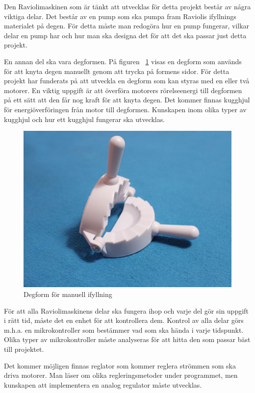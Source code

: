 Den Raviolimaskinen som är tänkt att utvecklas för detta projekt består av några viktiga delar. Det består av en pump som ska pumpa fram Raviolis ifyllnings materialet på degen. För detta måste man redogöra hur en pump fungerar, vilkar delar en pump har och hur man ska designa det för att det ska passar just detta projekt.\medskip

En annan del ska vara degformen. På figuren ~\ref{degfrom} visas en degform som används för att knyta degen manuellt genom att trycka på formens sidor. För detta projekt har funderats på att utveckla en degform som kan styras med en eller två motorer. En viktig uppgift är att överföra motorers rörelseenergi till degformen på ett sätt att den får nog kraft för att knyta degen. Det kommer finnas kugghjul för energiöverföringen från motor till degformen. Kunskapen inom olika typer av kugghjul och hur ett kugghjul fungerar ska utvecklas.\medskip

\begin{figure}[h]
	\begin{center}
		\includegraphics[scale=0.08] {images/degform.jpg}
		\caption{Degform för manuell ifyllning}
		\label{degfrom}	
	\end{center}
\end{figure}\medskip

För att alla Raviolimaskinens delar ska fungera ihop och varje del gör sin uppgift i rätt tid, måste det en enhet för att kontrollera dem. Kontrol av alla delar görs m.h.a. en mikrokontroller som bestämmer vad som ska hända i varje tidspunkt. Olika typer av mikrokontroller måste analyseras för att hitta den som passar bäst till projektet.

Det kommer möjligen finnas reglator som kommer reglera strömmen som ska driva motorer. Man läser om olika regleringsmetoder under programmet, men kunskapen att implementera en analog regulator måste utvecklas.




